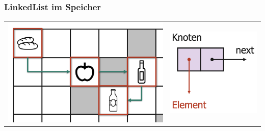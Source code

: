 \documentclass[a4paper, landscape, 8pt]{scrartcl}
\begin{document}
\begin{multicols*}{4}
                \subsubsection{LinkedList im Speicher}
                    \begin{tabular}{l | r}
                        \includegraphics[scale=0.13]{graphic/01_linkedlist_im_speicher} &
                        \includegraphics[scale=0.14]{graphic/07_knoten_linkedlist} \\
                    \end{tabular}


\end{multicols*}
\end{document}
